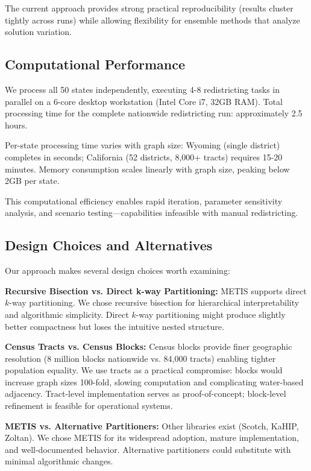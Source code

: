 The current approach provides strong practical reproducibility (results cluster tightly across runs) while allowing flexibility for ensemble methods that analyze solution variation.

\subsection{Computational Performance}

We process all 50 states independently, executing 4-8 redistricting tasks in parallel on a 6-core desktop workstation (Intel Core i7, 32GB RAM). Total processing time for the complete nationwide redistricting run: approximately 2.5 hours.

Per-state processing time varies with graph size: Wyoming (single district) completes in seconds; California (52 districts, 8,000+ tracts) requires 15-20 minutes. Memory consumption scales linearly with graph size, peaking below 2GB per state.

This computational efficiency enables rapid iteration, parameter sensitivity analysis, and scenario testing—capabilities infeasible with manual redistricting.

\subsection{Design Choices and Alternatives}

Our approach makes several design choices worth examining:

\textbf{Recursive Bisection vs. Direct k-way Partitioning:} METIS supports direct $k$-way partitioning. We chose recursive bisection for hierarchical interpretability and algorithmic simplicity. Direct $k$-way partitioning might produce slightly better compactness but loses the intuitive nested structure.

\textbf{Census Tracts vs. Census Blocks:} Census blocks provide finer geographic resolution (8 million blocks nationwide vs. 84,000 tracts) enabling tighter population equality. We use tracts as a practical compromise: blocks would increase graph sizes 100-fold, slowing computation and complicating water-based adjacency. Tract-level implementation serves as proof-of-concept; block-level refinement is feasible for operational systems.

\textbf{METIS vs. Alternative Partitioners:} Other libraries exist (Scotch, KaHIP, Zoltan). We chose METIS for its widespread adoption, mature implementation, and well-documented behavior. Alternative partitioners could substitute with minimal algorithmic changes.

